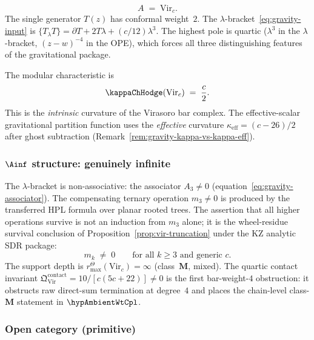 \begin{equation}\label{eq:grav-boundary-algebra}
A \;=\; \mathrm{Vir}_c.
\end{equation}
The single generator $T(z)$ has conformal weight~$2$.
The $\lambda$-bracket~\eqref{eq:gravity-input} is
$\{T_\lambda T\} = \partial T + 2T\lambda + (c/12)\lambda^3$.
The highest pole is quartic ($\lambda^3$ in the
$\lambda$-bracket, $(z-w)^{-4}$ in the OPE), which forces
all three distinguishing features of the gravitational
package.

The modular characteristic is
\begin{equation}\label{eq:grav-kappa-intrinsic}
\kappaChHodge(\mathrm{Vir}_c) \;=\; \frac{c}{2}.
\end{equation}
This is the \emph{intrinsic} curvature of the Virasoro bar
complex. The effective-scalar gravitational partition function uses the
\emph{effective} curvature $\kappa_{\mathrm{eff}} = (c-26)/2$
after ghost subtraction
(Remark~\ref{rem:gravity-kappa-vs-kappa-eff}).

\subsubsection*{$\Ainf$ structure: genuinely infinite}

The $\lambda$-bracket is non-associative: the associator
$A_3 \ne 0$ (equation~\eqref{eq:gravity-associator}).
The compensating ternary operation $m_3 \ne 0$ is produced by the
transferred HPL formula over planar rooted trees. The assertion that all
higher operations survive is not an induction from $m_3$ alone; it is
the wheel-residue survival conclusion of
Proposition~\ref{prop:vir-truncation} under the KZ analytic SDR package:
\begin{equation}\label{eq:grav-all-mk}
m_k \;\ne\; 0
\qquad
\text{for all } k \ge 3 \text{ and generic } c.
\end{equation}
The support depth is \(r^\Theta_{\max}(\mathrm{Vir}_c)=\infty\)
(class~$\mathbf{M}$, mixed). The quartic contact invariant
$\mathfrak{Q}^{\mathrm{contact}}_{\mathrm{Vir}}
= 10/[c(5c+22)] \ne 0$ is the first bar-weight-$4$ obstruction:
it obstructs raw direct-sum termination at degree~$4$ and places the
chain-level class-$\mathbf M$ statement in $\hypAmbientWtCpl$.

\subsubsection*{Open category (primitive)}

